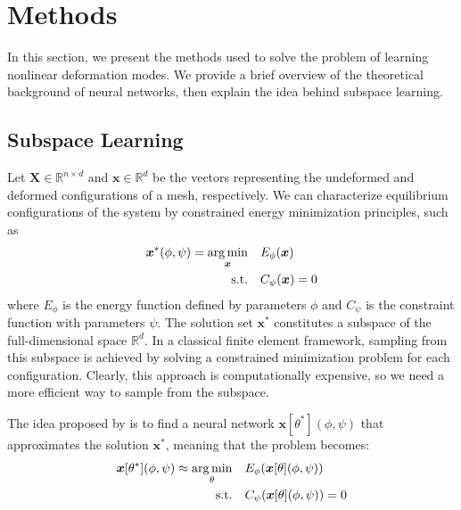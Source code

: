 \section{Methods}
\label{sec:methods}

In this section, we present the methods used to solve the problem of learning nonlinear deformation modes. We provide a brief overview of the theoretical background of neural networks, then explain the idea behind subspace learning.

\subsection{Subspace Learning}

Let \( \bm{X} \in \mathbb{R}^{n \times d} \) and \( \bm{x} \in \mathbb{R}^{d} \) be the vectors representing the undeformed and deformed configurations of a mesh, respectively. We can characterize equilibrium configurations of the system by constrained energy minimization principles, such as 
\begin{align*}
    \bm{x}^*(\phi, \psi) = \underset{\bm{x}}{\operatorname*{arg\,min}} \quad & E_\phi(\bm{x}) \\
    \text{s.t.} \quad & C_\psi(\bm{x}) = 0
\end{align*}
where \( E_\phi \) is the energy function defined by parameters \(\phi\) and \( C_\psi \) is the constraint function with parameters \(\psi\). The solution set \( \bm{x}^* \) constitutes a subspace of the full-dimensional space \( \mathbb{R}^d \). In a classical finite element framework, sampling from this subspace is achieved by solving a constrained minimization problem for each configuration. Clearly, this approach is computationally expensive, so we need a more efficient way to sample from the subspace.

The idea proposed by \cite{Wang_Du_Coros_Thomaszewski_2024} is to find a neural network \( \bm{x}[\theta^*](\phi, \psi) \) that approximates the solution \( \bm{x}^* \), meaning that the problem becomes:
\begin{align*}
    \bm{x}[\theta^*](\phi, \psi) \approx \underset{\theta}{\operatorname*{arg\,min}} \quad & E_\phi(\bm{x}[\theta](\phi, \psi)) \\
    \text{s.t.} \quad & C_\psi(\bm{x}[\theta](\phi, \psi)) = 0
\end{align*}

